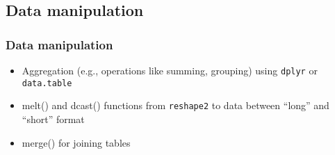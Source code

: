 \documentclass[
	11pt, %
]{beamer}
\begin{document}
\subsection{Data manipulation}

\begin{frame}
	\frametitle{Data manipulation}
	
	\begin{itemize}
			\item Aggregation (e.g., operations like summing, grouping) using \texttt{dplyr} or \texttt{data.table}
			\item melt() and dcast() functions from \texttt{reshape2} to \href{https://seananderson.ca/2013/10/19/reshape/}{\color{blue}{transform}} data between ``long” and ``short” format
			\item merge() for joining tables
	\end{itemize}
\end{frame}
\end{document}
